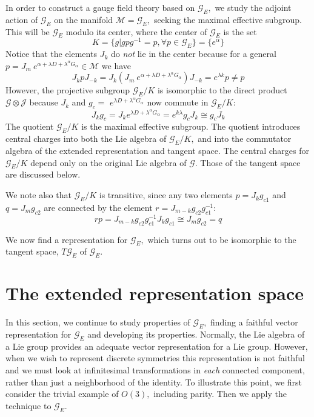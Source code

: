\documentclass[a4paper,12pt]{article}
\begin{document}
In order to construct a gauge field theory based on $\mathcal{G}_{E},$ we
study the adjoint action of $\mathcal{G}_{E}$ on the manifold $\mathcal{M}=%
\mathcal{G}_{E},$ seeking the maximal effective subgroup. This will be $%
\mathcal{G}_{E}$ modulo its center, where the center of $\mathcal{G}_{E}$ is
the set 
\begin{equation}
K=\{g|gpg^{-1}=p,\forall p\in \mathcal{G}_{E}\}=\{e^{\alpha }\}
\end{equation}
Notice that the elements $J_{k}$ do \textit{not} lie in the center because
for a general $p=J_{m}\ e^{\alpha +\lambda D+\lambda ^{\alpha }G_{\alpha
}}\in \mathcal{M}$ we have 
\begin{equation}
J_{k}pJ_{-k}=J_{k}(J_{m}\ e^{\alpha +\lambda D+\lambda ^{\alpha }G_{\alpha
}})J_{-k}=e^{\lambda k}p\neq p
\end{equation}
However, the projective subgroup $\mathcal{G}_{E}/K$ is isomorphic to the
direct product $\mathcal{G}\otimes \mathcal{J}$ because $J_{k}$ and $g_{c}=$ 
$e^{\lambda D+\lambda ^{\alpha }G_{\alpha }}$ now commute in $\mathcal{G}%
_{E}/K$: 
\begin{equation}
J_{k}g_{c}=J_{k}e^{\lambda D+\lambda ^{\alpha }G_{\alpha }}=e^{k\lambda
}g_{c}J_{k}\cong g_{c}J_{k}
\end{equation}
The quotient $\mathcal{G}_{E}/K$ is the maximal effective subgroup. The
quotient introduces central charges into both the Lie algebra of $\mathcal{G}
_{E}/K,$ and into the commutator algebra of the extended representation and
tangent space. The central charges for $\mathcal{G}_{E}/K$ depend only on
the original Lie algebra of $\mathcal{G}.$ Those of the tangent space are
discussed below.

We note also that $\mathcal{G}_{E}/K$ is transitive, since any two elements $%
p=J_{k}g_{c1}$ and $q=J_{m}g_{c2}$ are connected by the element $%
r=J_{m-k}g_{c2}g_{c1}^{-1}:$%
\begin{equation}
rp=J_{m-k}g_{c2}g_{c1}^{-1}J_{k}g_{c1}\cong J_{m}g_{c2}=q
\end{equation}

We now find a representation for $\mathcal{G}_{E},$ which turns out to be
isomorphic to the tangent space, $T\mathcal{G}_{E}$ of $\mathcal{G}_{E}.$

\section{The extended representation space}

In this section, we continue to study properties of $\mathcal{G}_{E},$
finding a faithful vector representation for $\mathcal{G}_{E}$ and
developing its properties. Normally, the Lie algebra of a Lie group provides
an adequate vector representation for a Lie group. However, when we wish to
represent discrete symmetries this representation is not faithful and we
must look at infinitesimal transformations in \textit{each }connected
component, rather than just a neighborhood of the identity. To illustrate
this point, we first consider the trivial example of $O(3),$ including
parity. Then we apply the technique to $\mathcal{G}_{E}.$
\end{document}
